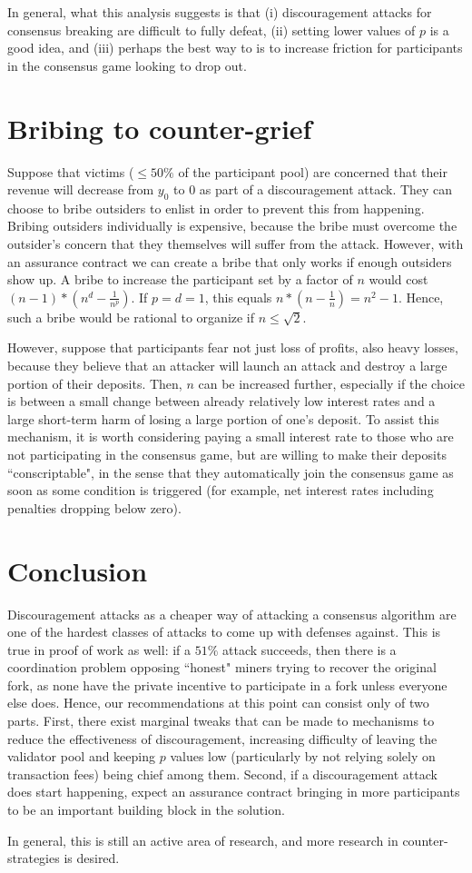 \documentclass[12pt]{article}
\begin{document}
In general, what this analysis suggests is that (i) discouragement attacks for consensus breaking are difficult to fully defeat, (ii) setting lower values of $p$ is a good idea, and (iii) perhaps the best way to is to increase friction for participants in the consensus game looking to drop out.

\section{Bribing to counter-grief}

Suppose that victims ($\le 50\%$ of the participant pool) are concerned that their revenue will decrease from $y_0$ to 0 as part of a discouragement attack. They can choose to bribe outsiders to enlist in order to prevent this from happening. Bribing outsiders individually is expensive, because the bribe must overcome the outsider's concern that they themselves will suffer from the attack. However, with an assurance contract we can create a bribe that only works if enough outsiders show up. A bribe to increase the participant set by a factor of $n$ would cost $(n - 1) * (n^d - \frac{1}{n^p})$. If $p = d = 1$, this equals $n * (n - \frac{1}{n}) = n^2 - 1$. Hence, such a bribe would be rational to organize if $n \le \sqrt{2}$.

However, suppose that participants fear not just loss of profits, also heavy losses, because they believe that an attacker will launch an attack and destroy a large portion of their deposits. Then, $n$ can be increased further, especially if the choice is between a small change between already relatively low interest rates and a large short-term harm of losing a large portion of one's deposit. To assist this mechanism, it is worth considering paying a small interest rate to those who are not participating in the consensus game, but are willing to make their deposits ``conscriptable", in the sense that they automatically join the consensus game as soon as some condition is triggered (for example, net interest rates including penalties dropping below zero).


\section{Conclusion}

Discouragement attacks as a cheaper way of attacking a consensus algorithm are one of the hardest classes of attacks to come up with defenses against. This is true in proof of work as well: if a $51\%$ attack succeeds, then there is a coordination problem opposing ``honest" miners trying to recover the original fork, as none have the private incentive to participate in a fork unless everyone else does. Hence, our recommendations at this point can consist only of two parts. First, there exist marginal tweaks that can be made to mechanisms to reduce the effectiveness of discouragement, increasing difficulty of leaving the validator pool and keeping $p$ values low (particularly by not relying solely on transaction fees) being chief among them. Second, if a discouragement attack does start happening, expect an assurance contract bringing in more participants to be an important building block in the solution.

In general, this is still an active area of research, and more research in counter-strategies is desired.



\end{document}
